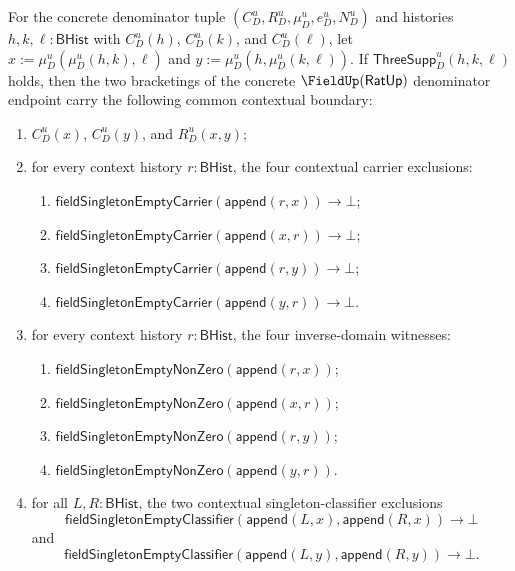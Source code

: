 \begin{theorem}
\label{thm:ratup-fieldup-bracketing-independent-threefold-contextual-boundary}
For the concrete denominator tuple $(C_D^u,R_D^u,\mu_D^u,e_D^u,N_D^u)$ and
histories $h,k,\ell:\mathsf{BHist}$ with $C_D^u(h)$, $C_D^u(k)$, and
$C_D^u(\ell)$, let $x:=\mu_D^u(\mu_D^u(h,k),\ell)$ and
$y:=\mu_D^u(h,\mu_D^u(k,\ell))$. If
$\mathsf{ThreeSupp}_D^u(h,k,\ell)$ holds, then the two bracketings of the
concrete $\FieldUp(\mathsf{RatUp})$ denominator endpoint carry the following
common contextual boundary:
\begin{enumerate}
  \item $C_D^u(x)$, $C_D^u(y)$, and $R_D^u(x,y)$;
  \item for every context history $r:\mathsf{BHist}$, the four contextual
  carrier exclusions:
  \begin{enumerate}
    \item $\mathsf{fieldSingletonEmptyCarrier}(\mathsf{append}(r,x))\to\bot$;
    \item $\mathsf{fieldSingletonEmptyCarrier}(\mathsf{append}(x,r))\to\bot$;
    \item $\mathsf{fieldSingletonEmptyCarrier}(\mathsf{append}(r,y))\to\bot$;
    \item $\mathsf{fieldSingletonEmptyCarrier}(\mathsf{append}(y,r))\to\bot$.
  \end{enumerate}
  \item for every context history $r:\mathsf{BHist}$, the four inverse-domain
  witnesses:
  \begin{enumerate}
    \item $\mathsf{fieldSingletonEmptyNonZero}(\mathsf{append}(r,x))$;
    \item $\mathsf{fieldSingletonEmptyNonZero}(\mathsf{append}(x,r))$;
    \item $\mathsf{fieldSingletonEmptyNonZero}(\mathsf{append}(r,y))$;
    \item $\mathsf{fieldSingletonEmptyNonZero}(\mathsf{append}(y,r))$.
  \end{enumerate}
  \item for all $L,R:\mathsf{BHist}$, the two contextual
  singleton-classifier exclusions
  $$
  \mathsf{fieldSingletonEmptyClassifier}(\mathsf{append}(L,x),\mathsf{append}(R,x))
  \to\bot
  $$
  and
  $$
  \mathsf{fieldSingletonEmptyClassifier}(\mathsf{append}(L,y),\mathsf{append}(R,y))
  \to\bot.
  $$
\end{enumerate}
\end{theorem}
